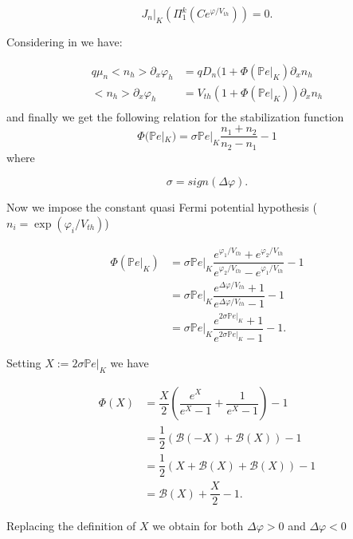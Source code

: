\begin{equation}
\label{eq: condizione JnK nulla}
J_n|_K(\Pi_1^k(Ce^{\varphi / V_{th}})) = 0 .
\end{equation}

Considering  in  we have:

\begin{align*}
q\mu_n <n_h>\partial_x \varphi_h & = q D_ n(1+\Phi(\mathbb{P}e|_K)\partial_x n_h \\
<n_h>\partial_x \varphi_h & = V_{th}(1+\Phi(\mathbb{P}e|_K))\partial_x n_h \\
\end{align*}
and finally we get the following relation for the stabilization function
\begin{equation}
\label{eq: SG stab func alternative}
\Phi(\mathbb{P}e|_K)  = \sigma \mathbb{P}e|_K \dfrac{n_1+n_2}{n_2-n_1}  -1
\end{equation}
where 

\begin{equation*}
\sigma = sign(\Delta \varphi).
\end{equation*}

Now we impose the constant quasi Fermi potential hypothesis ($n_i = \exp(\varphi_i/V_{th})$)

\begin{align*}
\Phi(\mathbb{P}e|_K) & = \sigma \mathbb{P}e|_K \dfrac{e^{\varphi_1/V_{th}}+e^{\varphi_2/V_{th}}}{e^{\varphi_2/V_{th}}-e^{\varphi_1/V_{th}}} -1 \\
& = \sigma \mathbb{P}e|_K \dfrac{e^{\Delta \varphi/V_{th}}+1}{e^{\Delta \varphi/V_{th}}-1} -1 \\
& = \sigma \mathbb{P}e|_K \dfrac{e^{2 \sigma \mathbb{P}e|_K}+1}{e^{2\sigma \mathbb{P}e|_K}-1} -1.
\end{align*}

Setting $X := 2 \sigma \mathbb{P}e|_K$ we have

\begin{align*}
\Phi(X) & = \dfrac{X}{2} \left( \dfrac{e^{X}}{e^{X}-1} + \dfrac{1}{e^{X}-1} \right) -1 \\
& = \dfrac{1}{2} \left( \mathcal{B}(-X) + \mathcal{B}(X) \right) -1 \\
 & = \dfrac{1}{2} \left( X + \mathcal{B}(X) + \mathcal{B}(X) \right) -1 \\
  & =  \mathcal{B}(X) +\dfrac{X}{2}  -1.
\end{align*}

Replacing the definition of $X$ we obtain for both $\Delta \varphi > 0$ and $\Delta \varphi < 0$

